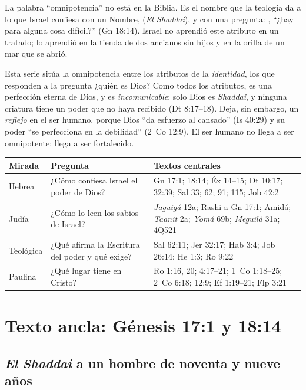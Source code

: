 La palabra ``omnipotencia'' no está en la Biblia. Es el nombre que la teología da a lo que Israel confiesa con un Nombre,  (\emph{El Shaddai}), y con una pregunta: , ``¿hay para \SENOR{} alguna cosa difícil?'' (Gn 18:14). Israel no aprendió este atributo en un tratado; lo aprendió en la tienda de dos ancianos sin hijos y en la orilla de un mar que se abrió.

Esta serie sitúa la omnipotencia entre los atributos de la \emph{identidad}, los que responden a la pregunta ¿quién es Dios? Como todos los atributos, es una perfección eterna de Dios, y es \emph{incomunicable}: solo Dios es \emph{Shaddai}, y ninguna criatura tiene un poder que no haya recibido (Dt 8:17--18). Deja, sin embargo, un \emph{reflejo} en el ser humano, porque Dios ``da esfuerzo al cansado'' (Is 40:29) y su poder ``se perfecciona en la debilidad'' (2~Co 12:9). El ser humano no llega a ser omnipotente; llega a ser fortalecido.

\begin{center}\small\renewcommand{\arraystretch}{1.25}
\begin{tabular}{@{}L{2.6cm}L{5.4cm}L{6.4cm}@{}}
\toprule
\textbf{Mirada} & \textbf{Pregunta} & \textbf{Textos centrales} \\ \midrule
Hebrea & ¿Cómo confiesa Israel el poder de Dios? & Gn 17:1; 18:14; Éx 14--15; Dt 10:17; 32:39; Sal 33; 62; 91; 115; Job 42:2 \\
Judía & ¿Cómo lo leen los sabios de Israel? & \emph{Jaguigá} 12a; Rashi a Gn 17:1; Amidá; \emph{Taanit} 2a; \emph{Yomá} 69b; \emph{Meguilá} 31a; 4Q521 \\
Teológica & ¿Qué afirma la Escritura del poder y qué exige? & Sal 62:11; Jer 32:17; Hab 3:4; Job 26:14; He 1:3; Ro 9:22 \\
Paulina & ¿Qué lugar tiene en Cristo? & Ro 1:16, 20; 4:17--21; 1~Co 1:18--25; 2~Co 6:18; 12:9; Ef 1:19--21; Flp 3:21 \\
\bottomrule
\end{tabular}\end{center}

\section{Texto ancla: Génesis 17:1 y 18:14}

\subsection{\emph{El Shaddai} a un hombre de noventa y nueve años}

